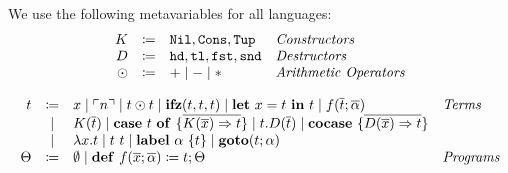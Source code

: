 \begin{definition}
    We use the following metavariables for all languages:
    \[
      \begin{array}{rcll}
        K & \coloneqq & \mathtt{Nil}, \mathtt{Cons}, \mathtt{Tup} & \emph{Constructors}\\
        D & \coloneqq & \mathtt{hd}, \mathtt{tl}, \mathtt{fst}, \mathtt{snd} & \emph{Destructors}\\
        \odot  & \coloneqq & + \mid - \mid * & \emph{Arithmetic Operators}
      \end{array}
    \]
  \end{definition}
  
  \begin{definition}
    \[ 
      \begin{array}{r c l l}
        t & \coloneqq & x \mid \ulcorner n \urcorner \mid t \odot t \mid \mathbf{ifz}(t, t, t) \mid \mathbf{let}\ x = t\ \mathbf{in}\ t \mid f(\overline{t}; \overline{\alpha}) & \emph{Terms}\\
        & \mid & K(\overline{t}) \mid \mathbf{case}\ t\ \mathbf{of}\ \{ \overline{K(\overline{x}) \Rightarrow t} \} \mid t.D(\overline{t}) \mid \mathbf{cocase}\ \{ \overline{D(\overline{x}) \Rightarrow t} \} & \\
        & \mid & \lambda x.t \mid t\ t \mid \mathbf{label}\ \alpha\ \{t \} \mid \mathbf{goto}(t; \alpha) & \\
        \Theta & \coloneqq & \emptyset \mid \mathbf{def}\ f(\overline{x};\overline{\alpha}) \coloneq t; \Theta & \emph{Programs}\\
      \end{array}
    \]
  \end{definition}
